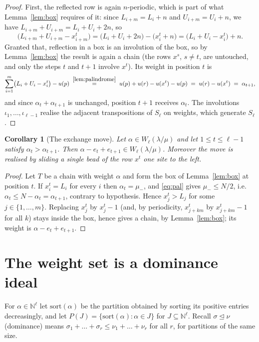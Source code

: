 \documentclass[11pt]{article}
\theoremstyle{plain}
\newtheorem{cor}[thm]{Corollary}
\theoremstyle{definition}
\newcommand{\N}{\mathbb{N}}
\begin{document}
\begin{proof}
First, the reflected row is again $n$-periodic, which is part of what Lemma~\ref{lem:box}
requires of it: since $L_{i+m}=L_i+n$ and $U_{i+m}=U_i+n$, we have
$L_{i+m}+U_{i+m}=L_i+U_i+2n$, so
\[
  \bigl(L_{i+m}+U_{i+m}-x^{t}_{i+m}\bigr)
  =\bigl(L_i+U_i+2n\bigr)-\bigl(x^{t}_i+n\bigr)
  =\bigl(L_i+U_i-x^{t}_i\bigr)+n .
\]
Granted that, reflection in a box is an involution of the box, so by Lemma~\ref{lem:box} the
result is again a chain (the rows $x^{s}$, $s\ne t$, are untouched, and only the steps $t$ and
$t+1$ involve $x^t$). Its weight in position $t$ is
\[
  \sum_{i=1}^{m}\bigl(L_i+U_i-x^{t}_i\bigr)-u(p)
  \;\overset{\ref{lem:palindrome}}{=}\;u(p)+u(r)-u(x^{t})-u(p)\;=\;u(r)-u(x^t)\;=\;\alpha_{t+1},
\]
and since $\alpha_t+\alpha_{t+1}$ is unchanged, position $t+1$ receives $\alpha_t$. The
involutions $\iota_1,\dots,\iota_{\ell-1}$ realise the adjacent transpositions of $S_\ell$ on
weights, which generate $S_\ell$.
\end{proof}

\begin{cor}[The exchange move]\label{cor:exchange}
Let $\alpha\in W_\ell(\lambda/\mu)$ and let $1\le t\le\ell-1$ satisfy $\alpha_t>\alpha_{t+1}$.
Then $\alpha-e_t+e_{t+1}\in W_\ell(\lambda/\mu)$. Moreover the move is realised by sliding a
single bead of the row $x^{t}$ one site to the left.
\end{cor}

\begin{proof}
Let $T$ be a chain with weight $\alpha$ and form the box of Lemma~\ref{lem:box} at position
$t$. If $x^{t}_i=L_i$ for every $i$ then $\alpha_t=\mu_-$, and \eqref{eq:pal} gives
$\mu_-\le N/2$, i.e.\ $\alpha_t\le N-\alpha_t=\alpha_{t+1}$, contrary to hypothesis. Hence
$x^{t}_j>L_j$ for some $j\in\{1,\dots,m\}$. Replacing $x^{t}_j$ by $x^{t}_j-1$ (and, by
periodicity, $x^{t}_{j+km}$ by $x^{t}_{j+km}-1$ for all $k$) stays inside the box, hence gives
a chain, by Lemma~\ref{lem:box}; its weight is $\alpha-e_t+e_{t+1}$.
\end{proof}

\section{The weight set is a dominance ideal}\label{sec:ideal}

For $\alpha\in\N^{\ell}$ let $\mathrm{sort}(\alpha)$ be the partition obtained by sorting its
positive entries decreasingly, and let $P(J)=\{\mathrm{sort}(\alpha):\alpha\in J\}$ for
$J\subseteq\N^\ell$. Recall $\sigma\trianglelefteq\nu$ (dominance) means
$\sigma_1+\dots+\sigma_r\le\nu_1+\dots+\nu_r$ for all $r$, for partitions of the same size.
\end{document}
